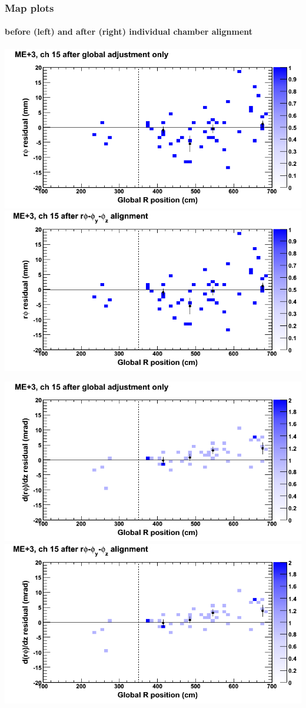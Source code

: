 \documentclass[compress]{beamer}
\begin{document}
\begin{frame}
\frametitle{Map plots}
\framesubtitle{before (left) and after (right) individual chamber alignment}
\includegraphics[width=0.5\linewidth]{ringmapplots_3dof/before_CSCvsr_mep3ch15_x.png} \includegraphics[width=0.5\linewidth]{ringmapplots_3dof/after_CSCvsr_mep3ch15_x.png}

\includegraphics[width=0.5\linewidth]{ringmapplots_3dof/before_CSCvsr_mep3ch15_dxdz.png} \includegraphics[width=0.5\linewidth]{ringmapplots_3dof/after_CSCvsr_mep3ch15_dxdz.png}
\end{frame}
\end{document}
